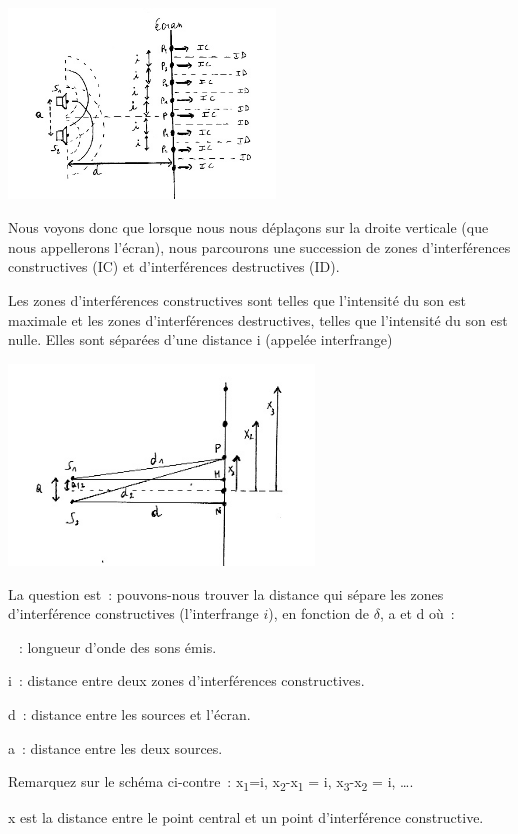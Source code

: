 \includegraphics[width=7.086cm,height=5.068cm]{Pictures/10000001000001CB00000148F2D7DB2B0F2EC580.png}

Nous
voyons donc que lorsque nous nous déplaçons sur la droite verticale (que
nous appellerons l'écran), nous parcourons une succession de zones
d'interférences constructives (IC) et d'interférences destructives (ID).

Les zones d'interférences constructives sont telles que l'intensité du
son est maximale et les zones d'interférences destructives, telles que
l'intensité du son est nulle. Elles sont séparées d'une distance i
(appelée interfrange)

\includegraphics[width=8.123cm,height=5.352cm]{Pictures/100000010000018B00000104CBB3B40EFC3646D7.png}

La question est~: pouvons-nous trouver la distance qui sépare les zones
d'interférence constructives (l'interfrange $i$), en fonction de
$\delta$, a et d où~: 

~: longueur d'onde des sons émis.

i~: distance entre deux zones d'interférences constructives.

d~: distance entre les sources et l'écran.

a~: distance entre les deux sources.

Remarquez sur le schéma ci-contre~: x\textsubscript{1}=i,
x\textsubscript{2}-x\textsubscript{1} = i,
x\textsubscript{3}-x\textsubscript{2} = i, \ldots.

x est la distance entre le point central et un point d'interférence
constructive.

